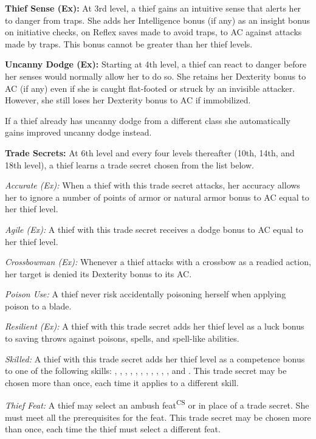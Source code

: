 \textbf{Thief Sense (Ex):} At 3rd level, a thief gains an intuitive sense that alerts her to danger from traps. She adds her Intelligence bonus (if any) as an insight bonus on initiative checks, on Reflex saves made to avoid traps, to AC against attacks made by traps. This bonus cannot be greater than \onehalf her thief levels.

\textbf{Uncanny Dodge (Ex):} Starting at 4th level, a thief can react to danger before her senses would normally allow her to do so. She retains her Dexterity bonus to AC (if any) even if she is caught flat-footed or struck by an invisible attacker. However, she still loses her Dexterity bonus to AC if immobilized.

If a thief already has uncanny dodge from a different class she automatically gains improved uncanny dodge instead.

\textbf{Trade Secrets:} At 6th level and every four levels thereafter (10th, 14th, and 18th level), a thief learns a trade secret chosen from the list below.

\textit{Accurate (Ex):} When a thief with this trade secret attacks, her accuracy allows her to ignore a number of points of armor or natural armor bonus to AC equal to \onequarter her thief level.

\textit{Agile (Ex):} A thief with this trade secret receives a dodge bonus to AC equal to \onequarter her thief level.

\textit{Crossbowman (Ex):} Whenever a thief attacks with a crossbow as a readied action, her target is denied its Dexterity bonus to its AC.

\textit{Poison Use:} A thief never risk accidentally poisoning herself when applying poison to a blade.

\textit{Resilient (Ex):} A thief with this trade secret adds \onehalf her thief level as a luck bonus to saving throws against poisons, spells, and spell-like abilities.

\textit{Skilled:} A thief with this trade secret adds \onequarter her thief level as a competence bonus to one of the following skills: , , , , , , , , , , , and . This trade secret may be chosen more than once, each time it applies to a different skill.

\textit{Thief Feat:} A thief may select an ambush feat\textsuperscript{CS} or  in place of a trade secret. She must meet all the prerequisites for the feat. This trade secret may be chosen more than once, each time the thief must select a different feat.

